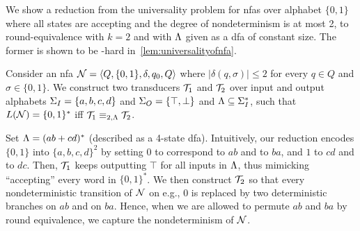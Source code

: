 We show a reduction from the universality problem for \glspl{nfa} over alphabet $\{0,1\}$ where all states are accepting and the degree of nondeterminism is at most 2, to round-equivalence with $k=2$ and with $\Lambda$ given as a \gls{dfa} of constant size. The former is shown to be \PSPACE-hard in~\cref{lem:universalityofnfa}.

Consider an \gls{nfa} $\mathcal{N}=\left< Q,\{0,1\},\delta,q_0,Q\right>$ where $|\delta(q,\sigma)|\le 2$ for every $q\in Q$ and $\sigma\in \{0,1\}$.
We construct two transducers $\mathcal{T}_1$ and $\mathcal{T}_2$ over input and output alphabets $\Sigma_{I}=\{a,b,c,d\}$ and $\Sigma_{O}=\{\top,\bot\}$ and $\Lambda\subseteq \Sigma_{I}^*$, such that $L(\mathcal{N})=\{0,1\}^*$ iff $\mathcal{T}_1\equiv_{2,\Lambda}\mathcal{T}_2$. 

Set $\Lambda=(ab+cd)^*$ (described as a 4-state \gls{dfa}). Intuitively, our reduction encodes $\{0,1\}$ into $\{a,b,c,d\}^2$ by setting $0$ to correspond to $ab$ and to $ba$, and $1$ to $cd$ and to $dc$. Then, $\mathcal{T}_1$ keeps outputting $\top$ for all inputs in $\Lambda$, thus mimicking ``accepting'' every word in $\{0,1\}^*$. We then construct $\mathcal{T}_2$ so that every nondeterministic transition of $\mathcal{N}$ on e.g., $0$ is replaced by two deterministic branches on $ab$ and on $ba$. Hence, when we are allowed to permute $ab$ and $ba$ by round equivalence, we capture the nondeterminism of $\mathcal{N}$. 

